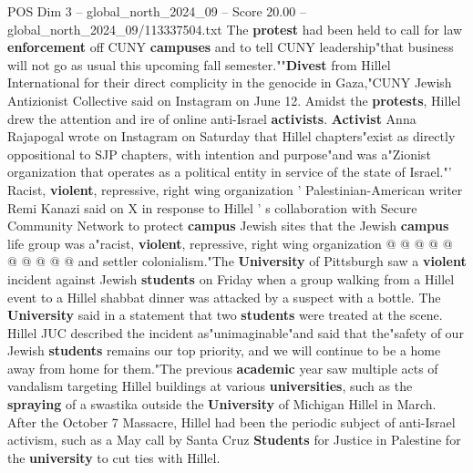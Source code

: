 \begin{textsample}{POS Dim 3 – global\_north\_2024\_09 – Score 20.00 – global\_north\_2024\_09/113337504.txt}
The \textbf{protest} had been held to call for law \textbf{enforcement} off CUNY \textbf{campuses} and to tell CUNY leadership"that business will not go as usual this upcoming fall semester.""\textbf{Divest} from Hillel International for their direct complicity in the genocide in Gaza,"CUNY Jewish Antizionist Collective said on Instagram on June 12.
Amidst the \textbf{protests}, Hillel drew the attention and ire of online anti-Israel \textbf{activists}. \textbf{Activist} Anna Rajapogal wrote on Instagram on Saturday that Hillel chapters"exist as directly oppositional to SJP chapters, with intention and purpose"and was a"Zionist organization that operates as a political entity in service of the state of Israel."' Racist, \textbf{violent}, repressive, right wing organization ' Palestinian-American writer Remi Kanazi said on X in response to Hillel ' s collaboration with Secure Community Network to protect \textbf{campus} Jewish sites that the Jewish \textbf{campus} life group was a"racist, \textbf{violent}, repressive, right wing organization @ @ @ @ @ @ @ @ @ @ and settler colonialism."The \textbf{University} of Pittsburgh saw a \textbf{violent} incident against Jewish \textbf{students} on Friday when a group walking from a Hillel event to a Hillel shabbat dinner was attacked by a suspect with a bottle.
The \textbf{University} said in a statement that two \textbf{students} were treated at the scene.
Hillel JUC described the incident as"unimaginable"and said that the"safety of our Jewish \textbf{students} remains our top priority, and we will continue to be a home away from home for them."The previous \textbf{academic} year saw multiple acts of vandalism targeting Hillel buildings at various \textbf{universities}, such as the \textbf{spraying} of a swastika outside the \textbf{University} of Michigan Hillel in March.
After the October 7 Massacre, Hillel had been the periodic subject of anti-Israel activism, such as a May call by Santa Cruz \textbf{Students} for Justice in Palestine for the \textbf{university} to cut ties with Hillel.

\end{textsample}
